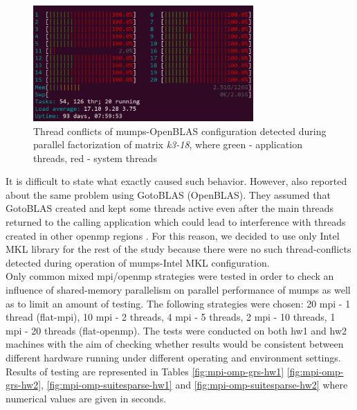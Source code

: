 \figpointer{\ref{fig:mumps:openblas-thread-conflcit}}
\begin{figure}[htpb]
  \centering
  \includegraphics[width=0.75\textwidth]{figures/chapter-2/openmp-mpi/thread-conflict.png}
\caption[Thread conflicts of \acrshort{mumps}-OpenBLAS configuration detected during parallel factorization of  matrix \textit{k3-18}]{Thread conflicts of \acrshort{mumps}-OpenBLAS configuration detected during parallel factorization of matrix \textit{k3-18}, where green - application threads, red - system threads}
\label{fig:mumps:openblas-thread-conflcit}
\end{figure}


It is difficult to state what exactly caused such behavior. However, \citeauthor{chowdhury2010some} also reported about the same problem using GotoBLAS (OpenBLAS). They assumed that GotoBLAS created and kept some threads active even after the main threads returned to the calling application which could lead to interference with threads created in other \acrshort{openmp} regions \cite{chowdhury2010some}. For this reason, we decided to use only Intel MKL library for the rest of the study because there were no such thread-conflicts detected during operation of \acrshort{mumps}-Intel MKL configuration.\\


Only common mixed \acrshort{mpi}/\acrshort{openmp} strategies were tested in order to check an influence of shared-memory parallelism on parallel performance of \acrshort{mumps} as well as to limit an amount of testing. The following strategies were chosen: 20 \acrshort{mpi} - 1 thread (flat-\acrshort{mpi}), 10 \acrshort{mpi} - 2 threads, 4 \acrshort{mpi} - 5 threads, 2 \acrshort{mpi} - 10 threads, 1 \acrshort{mpi} - 20 threads (flat-\acrshort{openmp}). The tests were conducted on both \gls{hw1} and \gls{hw2} machines with the aim of checking whether  results would be consistent between different hardware running under different operating and environment settings. Results of testing are represented in Tables \ref{fig:mpi-omp-grs-hw1} \ref{fig:mpi-omp-grs-hw2}, \ref{fig:mpi-omp-suitesparse-hw1} and \ref{fig:mpi-omp-suitesparse-hw2} where numerical values are given in seconds.\\


